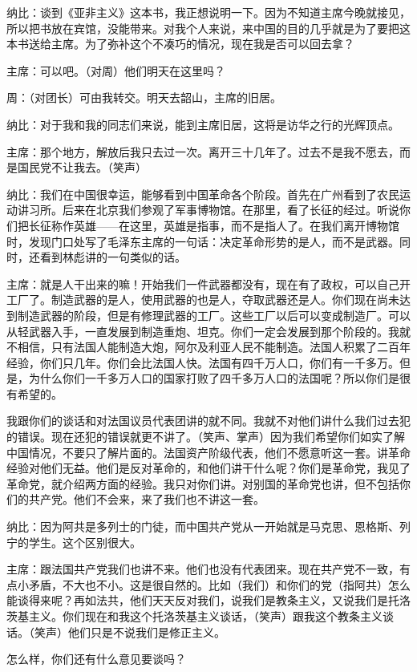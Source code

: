 纳比：谈到《亚非主义》这本书，我正想说明一下。因为不知道主席今晚就接见，所以把书放在宾馆，没能带来。对我个人来说，来中国的目的几乎就是为了要把这本书送给主席。为了弥补这个不凑巧的情况，现在我是否可以回去拿？

主席：可以吧。（对周）他们明天在这里吗？

周：（对团长）可由我转交。明天去韶山，主席的旧居。

纳比：对于我和我的同志们来说，能到主席旧居，这将是访华之行的光辉顶点。

主席：那个地方，解放后我只去过一次。离开三十几年了。过去不是我不愿去，而是国民党不让我去。（笑声）

纳比：我们在中国很幸运，能够看到中国革命各个阶段。首先在广州看到了农民运动讲习所。后来在北京我们参观了军事博物馆。在那里，看了长征的经过。听说你们把长征称作英雄——在这里，英雄是指事，而不是指人了。在我们离开博物馆时，发现门口处写了毛泽东主席的一句话：决定革命形势的是人，而不是武器。同时，还看到林彪讲的一句类似的话。

主席：就是人干出来的嘛！开始我们一件武器都没有，现在有了政权，可以自己开工厂了。制造武器的是人，使用武器的也是人，夺取武器还是人。你们现在尚未达到制造武器的阶段，但是有修理武器的工厂。这些工厂以后可以变成制造厂。可以从轻武器入手，一直发展到制造重炮、坦克。你们一定会发展到那个阶段的。我就不相信，只有法国人能制造大炮，阿尔及利亚人民不能制造。法国人积累了二百年经验，你们只几年。你们会比法国人快。法国有四千万人口，你们有一千多万。但是，为什么你们一千多万人口的国家打败了四千多万人口的法国呢？所以你们是很有希望的。

我跟你们的谈话和对法国议员代表团讲的就不同。我就不对他们讲什么我们过去犯的错误。现在还犯的错误就更不讲了。（笑声、掌声）因为我们希望你们如实了解中国情况，不要只了解片面的。法国资产阶级代表，他们不愿意听这一套。讲革命经验对他们无益。他们是反对革命的，和他们讲干什么呢？你们是革命党，我见了革命党，就介绍两方面的经验。我只对你们讲。对别国的革命党也讲，但不包括你们的共产党。他们不会来，来了我们也不讲这一套。

纳比：因为阿共是多列士的门徒，而中国共产党从一开始就是马克思、恩格斯、列宁的学生。这个区别很大。

主席：跟法国共产党我们也讲不来。他们也没有代表团来。现在共产党不一致，有点小矛盾，不大也不小。这是很自然的。比如（我们）和你们的党（指阿共）怎么能谈得来呢？再如法共，他们天天反对我们，说我们是教条主义，又说我们是托洛茨基主义。你们现在和我这个托洛茨基主义谈话，（笑声）跟我这个教条主义谈话。（笑声）他们只是不说我们是修正主义。

怎么样，你们还有什么意见要谈吗？

